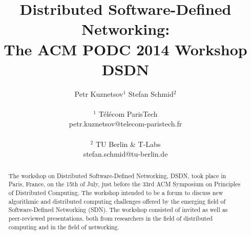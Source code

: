 \documentclass[11pt,pdftex,letter]{article}
\def\SAVESPACE{1}
\begin{document}
\sloppy




\title{Distributed Software-Defined Networking:\\ The ACM PODC 2014 Workshop \textbf{DSDN}}



\author{
Petr Kuznetsov$^{1}$ \quad Stefan Schmid$^{2}$\\
\\
       $^{1}$ T\'el\'ecom ParisTech\\
        petr.kuznetsov@telecom-paristech.fr\\
\\
        $^{2}$ TU Berlin \& T-Labs \\ %
	    stefan.schmid@tu-berlin.de}


\date{}


\maketitle


\thispagestyle{empty}





\begin{abstract}
The workshop on Distributed Software-Defined Networking, DSDN, took
place in Paris, France, on the 15th of July, just before
the 33rd ACM Symposium on Principles of Distributed Computing.
The workshop intended to be a forum to discuss new algorithmic and
distributed computing challenges offered by the emerging field of
Software-Defined Networking (SDN).
The workshop consisted of invited as well as peer-reviewed presentations, both
from researchers in the field of
distributed computing and in the field of networking.
\end{abstract}
\end{document}
